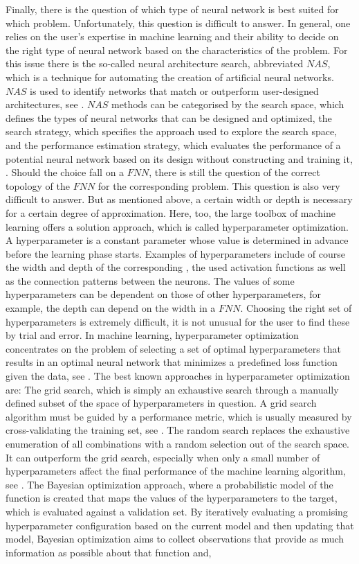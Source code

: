 Finally, there is the question of which type of neural network is best suited for which problem. Unfortunately, this question is difficult to answer. In general, one relies on the user's expertise in machine learning and their ability to decide on the right type of neural network based on the characteristics of the problem. For this issue there is the so-called neural architecture search, abbreviated $NAS$, which is a technique for automating the creation of artificial neural networks. $NAS$ is used to identify networks that match or outperform user-designed architectures, see \cite{ZophLe:2017}. $NAS$ methods can be categorised by the search space, which defines the types of neural networks that can be designed and optimized, the search strategy, which specifies the approach used to explore the search space, and the performance estimation strategy, which evaluates the performance of a potential neural network based on its design without constructing and training it, \cite{ElskenMetzenHutter:2019}. Should the choice fall on a $FNN$, there is still the question of the correct topology of the $FNN$ for the corresponding problem. This question is also very difficult to answer. But as mentioned above, a certain width or depth is necessary for a certain degree of approximation. Here, too, the large toolbox of machine learning offers a solution approach, which is called hyperparameter optimization. A hyperparameter is a constant parameter whose value is determined in advance before the learning phase starts. Examples of hyperparameters include of course the width and depth of the corresponding , the used activation functions as well as the connection patterns between the neurons. The values of some hyperparameters can be dependent on those of other hyperparameters, for example, the depth can depend on the width in a $FNN$. Choosing the right set of hyperparameters is extremely difficult, it is not unusual for the user to find these by trial and error. In machine learning, hyperparameter optimization concentrates on the problem of selecting a set of optimal hyperparameters that results in an optimal neural network that minimizes a predefined loss function given the data, see \cite{ClaesenDeMoor:2015}. The best known approaches in hyperparameter optimization are: The grid search, which is simply an exhaustive search through a manually defined subset of the space of hyperparameters in question. A grid search algorithm must be guided by a performance metric, which is usually measured by cross-validating the training set, see \cite{HsuChangLin:2003}. The random search replaces the exhaustive enumeration of all combinations with a random selection out of the search space. It can outperform the grid search, especially when only a small number of hyperparameters affect the final performance of the machine learning algorithm, see \cite{BergstraBengio:2012}. The Bayesian optimization approach, where a probabilistic model of the function is created that maps the values of the hyperparameters to the target, which is evaluated against a validation set. By iteratively evaluating a promising hyperparameter configuration based on the current model and then updating that model, Bayesian optimization aims to collect observations that provide as much information as possible about that function and, 
